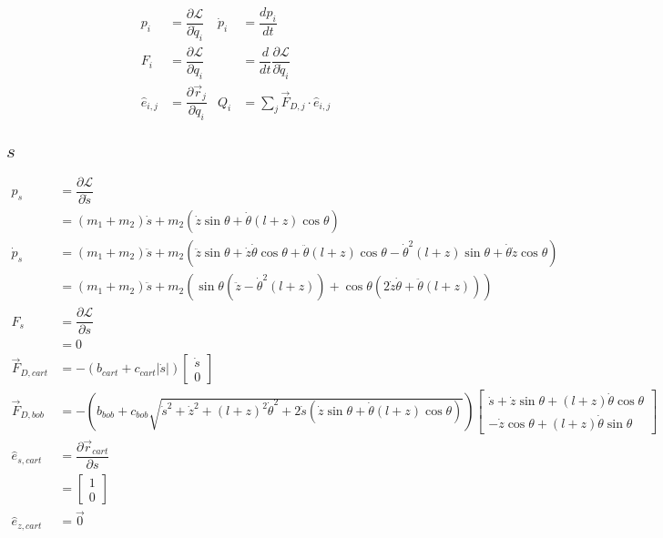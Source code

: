 \documentclass[12pt,a4paper,portrait]{article}
\newcommand{\lag}{\mathcal{L}}
\begin{document}
	\begin{align*}
		p_i &= \dfrac{\partial \lag}{\partial \dot{q}_i} & \dot{p}_i &= \dfrac{dp_i}{dt} \\
		F_i &= \dfrac{\partial \lag}{\partial q_i} & &= \dfrac{d}{dt}\dfrac{\partial \lag}{\partial \dot{q}_i}\\
		\hat{e}_{i,j} &= \dfrac{\partial \vec{r}_{j}}{\partial q_i} & Q_i &= \sum_{j} \vec{F}_{D, j} \cdot \hat{e}_{i,j}
	\end{align*}
	
	\subsection{$s$}
	\begin{align*}
		p_s &= \dfrac{\partial \lag}{\partial \dot{s}} \\
		&= (m_1+m_2)\dot{s} + m_2(\dot{z}\sin{\theta} + \dot{\theta}(l+z)\cos{\theta}) \\
		\dot{p}_s &= (m_1+m_2)\ddot{s} + m_2(\ddot{z}\sin{\theta}+\dot{z}\dot{\theta}\cos{\theta}+\ddot{\theta}(l+z)\cos{\theta}-\dot{\theta}^2(l+z)\sin{\theta}+\dot{\theta}\dot{z}\cos{\theta}) \\
		&= (m_1+m_2)\ddot{s} + m_2(\sin{\theta}(\ddot{z}-\dot{\theta}^2(l+z))+\cos{\theta}(2\dot{z}\dot{\theta}+\ddot{\theta}(l+z)))\\
		F_{s} &= \dfrac{\partial \lag}{\partial s} \\
		&= 0 \\
		\vec{F}_{D,cart} &= -(b_{cart}+c_{cart}|\dot{s}|)\begin{bmatrix}
			\dot{s}\\
			0
		\end{bmatrix} \\
		\vec{F}_{D,bob} &= -(b_{bob}+c_{bob}\sqrt{\dot{s}^2 + \dot{z}^2 + (l+z)^2\dot{\theta}^2 + 2\dot{s}(\dot{z}\sin{\theta} + \dot{\theta}(l+z)\cos{\theta})})\begin{bmatrix}
			\dot{s} + \dot{z}\sin{\theta} + (l+z)\dot{\theta}\cos{\theta} \\
			-\dot{z}\cos{\theta} + (l+z)\dot{\theta}\sin{\theta}
		\end{bmatrix} \\
		\hat{e}_{s, cart} &= \dfrac{\partial \vec{r}_{cart}}{\partial s} \\
		&= \begin{bmatrix}
			1 \\
			0
		\end{bmatrix} \\
		\hat{e}_{z, cart} &= \vec{0} \\

\end{align*}
\end{document}
